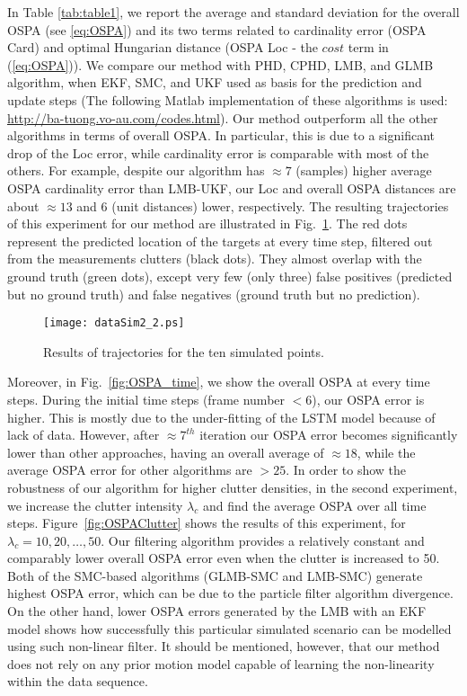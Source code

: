 \documentclass[runningheads]{llncs}
\begin{document}
In Table \ref{tab:table1}, we report the average and standard deviation for the overall OSPA (see \eqref{eq:OSPA}) and its two terms related to cardinality error (OSPA Card) and optimal Hungarian distance (OSPA Loc - the $cost$ term in (\ref{eq:OSPA})). We compare our method with PHD, CPHD, LMB, and GLMB algorithm, when EKF, SMC, and UKF used as basis for the prediction and update steps (The following Matlab implementation of these algorithms is used: \url{http://ba-tuong.vo-au.com/codes.html}). Our method outperform all the other algorithms in terms of overall OSPA. In particular, this is due to a significant drop of the Loc error, while cardinality error is comparable with most of the others. For example, despite our algorithm has $\approx 7$ (samples) higher average OSPA cardinality error than LMB-UKF, our Loc and overall OSPA distances are about $\approx 13$ and $6$ (unit distances) lower, respectively.
The resulting trajectories of this experiment for our method are illustrated in Fig.~\ref{fig:SimEnvRes}. The red dots represent the predicted location of the targets at every time step, filtered out from the measurements clutters (black dots). They almost overlap with the ground truth (green dots), except very few (only three) false positives (predicted but no ground truth) and false negatives (ground truth but no prediction).

\begin{figure}[!b]
\centering
\texttt{[image: dataSim2\_2.ps]}
\caption{Results of trajectories for the ten simulated points.}
\label{fig:SimEnvRes}
\end{figure}

Moreover, in Fig.~\ref{fig:OSPA_time}, we show the overall OSPA at every time steps. During the initial time steps (frame number $ < 6$), our OSPA error is higher. This is mostly due to the under-fitting of the LSTM model because of lack of data. However, after $\approx 7^{th}$ iteration our OSPA error becomes significantly lower than other approaches, having an overall average of $\approx 18$, while the average OSPA error for other algorithms are $> 25$. 
In order to show the robustness of our algorithm for higher clutter densities, in the second experiment, we increase the clutter intensity $\lambda_c$ and find the average OSPA over all time steps. Figure~\ref{fig:OSPAClutter} shows the results of this experiment, for $\lambda_c = 10, 20, \ldots, 50$. Our filtering algorithm provides a relatively constant and comparably lower overall OSPA error even when the clutter is increased to 50. Both of the SMC-based algorithms (GLMB-SMC and LMB-SMC) generate highest OSPA error, which can be due to the particle filter algorithm divergence. On the other hand, lower OSPA errors generated by the LMB with an EKF model shows how successfully this particular simulated scenario can be modelled using such non-linear filter. It should be mentioned, however, that our method does not rely on any prior motion model capable of learning the non-linearity within the data sequence.
\end{document}
